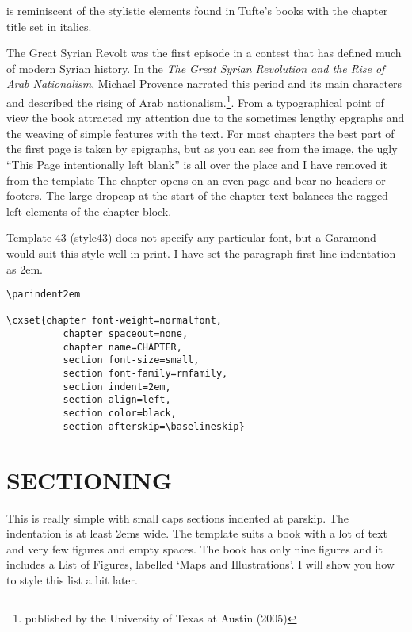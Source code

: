  is reminiscent of the stylistic elements found in Tufte's books with the chapter title set in italics.

The Great Syrian Revolt was the first episode in a contest that has defined
much of modern Syrian history. In
the \textit{The Great Syrian Revolution and the Rise of Arab Nationalism},  Michael Provence narrated this period and its main characters and described the rising of Arab nationalism.\footnote{published by the University of Texas at Austin (2005)}. From a typographical point of view the book attracted my attention due to the sometimes lengthy epgraphs and the weaving of simple features with the text. For most chapters the best part of the first page is taken by epigraphs, but as you can see from the image, the ugly ``This Page intentionally left blank'' is all over the place and I have removed it from the template  The chapter opens on an even page and bear no headers or footers. The large dropcap at the start of the chapter text balances the ragged left elements of the chapter block.

Template 43 (style43) does not specify any particular font, but a Garamond would suit this style well in print. I have set the paragraph first line indentation as 2em.

 \begin{verbatim} 
\parindent2em

\cxset{chapter font-weight=normalfont,
          chapter spaceout=none,
          chapter name=CHAPTER,
          section font-size=small,
          section font-family=rmfamily,
          section indent=2em,
          section align=left,
          section color=black,
          section afterskip=\baselineskip}
\end{verbatim}

              
                              
\section{SECTIONING}

This is really simple with small caps sections indented at parskip. The indentation is at least 2ems wide.
The template suits a book with a lot of text and very few figures and empty spaces. The book has only
nine figures and it includes a List of Figures, labelled `Maps and Illustrations’. I will show you how to style
this list a bit later. 
          
